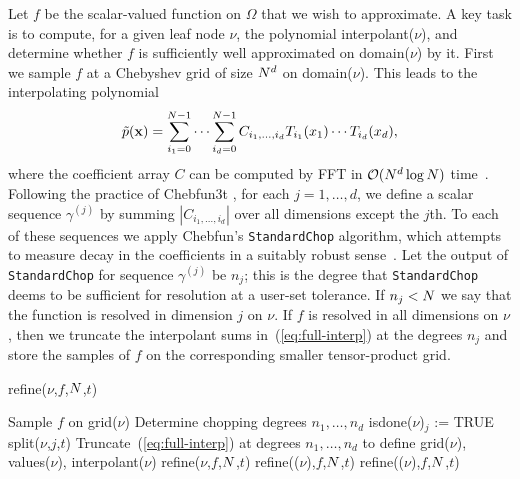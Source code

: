 Let $f$ be the scalar-valued function on $\Omega$ that we wish to approximate. A key task is to compute, for a given leaf node $\nu$, the polynomial \textsf{interpolant}($\nu$), and determine whether $f$ is sufficiently well approximated on \textsf{domain}($\nu$) by it. First we sample $f$ at a Chebyshev grid of size $N^d$ on \textsf{domain}($\nu$). This leads to the interpolating polynomial
\begin{equation}
  \label{eq:full-interp}
  \tilde{p}(\mathbf{x}) = \sum_{i_1=0}^{N-1} \cdots \sum_{i_d=0}^{N-1}  C_{i_1,\ldots,i_d} T_{i_1}(x_1)\cdots T_{i_d}(x_d),
\end{equation}
where the coefficient array $C$ can be computed by FFT in $\mathcal{O}(N^d \log N)$ time~\cite{mason2002chebyshev}. Following the practice of Chebfun3t \cite{Hashemi2017}, for each $j=1,\ldots,d$, we define a scalar sequence $\gamma^{(j)}$ by summing $|C_{i_1,\ldots,i_d}|$ over all dimensions except the $j$th. To each of these sequences we apply Chebfun's {\tt StandardChop}  algorithm, which attempts to measure decay in the coefficients in a suitably robust sense~\cite{Aurentz:2017:CCS:3034774.2998442}. Let the output of {\tt StandardChop} for sequence $\gamma^{(j)}$ be $n_j$; this is the degree that {\tt StandardChop} deems to be sufficient for resolution at a user-set tolerance.  If $n_j<N$ we say that the function is resolved in dimension $j$ on $\nu$. If $f$ is resolved in all dimensions on $\nu$, then we truncate the interpolant sums in~(\ref{eq:full-interp}) at the degrees $n_j$ and store the samples of $f$ on the corresponding smaller tensor-product grid. 

\begin{algorithm}
\caption{refine($\nu$,$f$,$N$,$t$)}
\label{alg:refine}
\begin{algorithmic}
    \STATE Sample $f$ on \textsf{grid}($\nu$)
    \STATE Determine chopping degrees $n_1,\ldots,n_d$
        \STATE \textsf{isdone}($\nu$)$_j$ := TRUE
      \ELSE
        \STATE split($\nu$,$j$,$t$)
      \ENDIF
    \ENDFOR
      \STATE Truncate~(\ref{eq:full-interp}) at degrees $n_1,\ldots,n_d$ to define \textsf{grid}($\nu$), \textsf{values}($\nu$), \textsf{interpolant}($\nu$)
    \ELSE
      \STATE refine($\nu$,$f$,$N$,$t$)
    \ENDIF
  \ELSE
    \STATE refine(($\nu$),$f$,$N$,$t$)      
    \STATE refine(($\nu$),$f$,$N$,$t$)
  \ENDIF
\end{algorithmic}
\end{algorithm}

